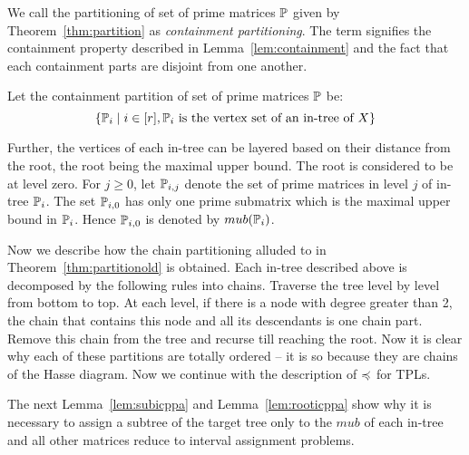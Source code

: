 We call the partitioning of set of prime matrices $\mathbb P$ given by
Theorem~\ref{thm:partition} as {\em containment partitioning}. The term
signifies the containment property described in
Lemma~\ref{lem:containment} and the fact that each containment parts
are disjoint from one another.

Let the containment partition of set of prime matrices $\mathbb P$ be: 
\[\{\mathbb P_i \mid i \in [r], \mathbb P_i \text{ is the vertex set of an
  in-tree of } X\}\] 

Further, the vertices of each in-tree can be
layered based on their distance from the root, the root being the
maximal upper bound.  The root is considered
to be at level zero. For $j \geq 0$, let $\mathbb P_{i,j}$ denote the set of
prime matrices in level $j$ of in-tree $\mathbb P_i$. The set $\mathbb P_{i,0}$
has only one prime submatrix which is the maximal upper bound in
$\mathbb P_i$. Hence $\mathbb P_{i,0}$ is denoted by $mub(\mathbb P_i)$.


Now we describe how the chain partitioning alluded to in
Theorem~\ref{thm:partitionold} is obtained. Each in-tree described
above is decomposed by the following rules into chains. Traverse the
tree level by level from bottom to top. At each level, if there is a
node with degree greater than 2, the chain that contains this node and
all its descendants is one chain part. Remove this chain from the tree
and recurse till reaching the root. Now it is clear why each of these
partitions are totally ordered -- it is so because they are chains of
the Hasse diagram. Now we continue with the description of
$\preccurlyeq$ for TPLs. 

The next Lemma~\ref{lem:subicppa} and Lemma~\ref{lem:rooticppa} show why it
is necessary to assign a subtree of the target tree only to the $mub$
of each in-tree and all other matrices reduce to interval assignment
problems.





